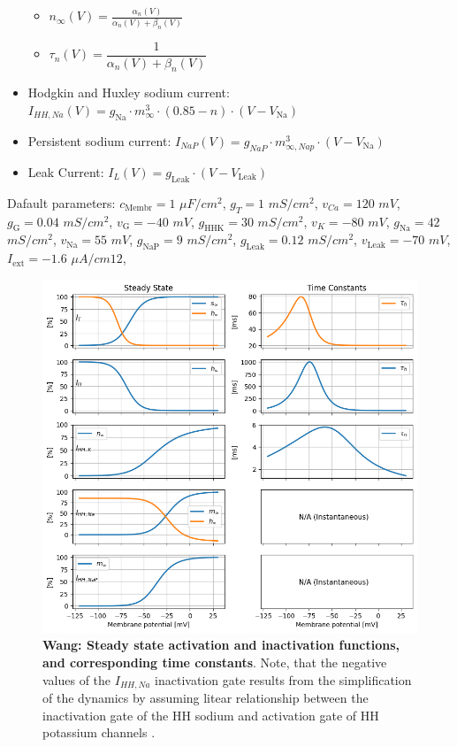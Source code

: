 \documentclass[../main.tex]{subfiles}
\begin{document}
\begin{itemize}
\begin{itemize}[label=\textopenbullet]
        \item $n_\infty(V)=\frac{\alpha_n(V)}{\alpha_n(V) + \beta_n(V)}$
        \item $\tau_n(V)=\dfrac{1}{\alpha_n(V) + \beta_n(V)}$
    \end{itemize}
    \item Hodgkin and Huxley sodium current: $I_{HH,Na}(V)=g_{\text{Na}} \cdot m_\infty^3 \cdot (0.85 - n) \cdot (V - V_{\text{Na}})$
    \item Persistent sodium current: $I_{NaP}(V)=g_{NaP} \cdot m_{\infty,Nap}^3 \cdot (V - V_{\text{Na}})$
    \item Leak Current: $I_L(V)=g_{\text{Leak}} \cdot (V - V_{\text{Leak}})$
\end{itemize}

Dafault parameters:
$c_{\text{Membr}}=1$ $\mu F/cm^2$,
$g_T=1$ $mS/cm^2$,
$v_{Ca}=120$ $mV$,
$g_{\text{G}}=0.04$ $mS/cm^2$,
$v_{\text{G}}=-40$ $mV$,
$g_{\text{HHK}}=30$ $mS/cm^2$,
$v_K=-80$ $mV$,
$g_{\text{Na}}=42$ $mS/cm^2$,
$v_{\text{Na}}=55$ $mV$,
$g_{\text{NaP}}=9$ $mS/cm^2$,
$g_{\text{Leak}}=0.12$ $mS/cm^2$,
$v_{\text{Leak}}=-70$ $mV$,
$I_{\text{ext}}=-1.6$ $\mu A / cm1 2$,

\begin{figure}[!t]
    \centering
    \includegraphics[width=\linewidth]{../img/model_kinetics/kinetics_wang.png}
    \caption[Wang: Steady state activation and inactivation functions, and corresponding time constants]{
        \textbf{Wang: Steady state activation and inactivation functions, and corresponding time constants}. Note, that the negative values of the $I_{HH,Na}$ inactivation gate results from the simplification of the dynamics by assuming litear relationship between the inactivation gate of the HH sodium and activation gate of HH potassium channels \parencite{wangMultipleDynamicalModes1994}.
    }
    \label{fig:kinetic_plots_wang1994}
\end{figure}
\clearpage
\end{document}
